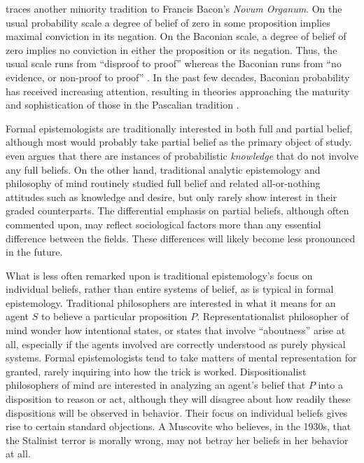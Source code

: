 \citet{cohen1980some} traces another minority tradition to Francis Bacon's {\em
Novum Organum}. On the usual probability scale a degree of belief of zero in
some proposition implies maximal conviction in its negation. On the Baconian
scale, a degree of belief of zero implies no conviction in either the
proposition or its negation. Thus, the usual scale runs from ``disproof to
proof'' whereas the Baconian runs from ``no evidence, or non-proof to proof''
\citep[p. 224]{cohen1980some}.  In the past few decades, Baconian probability
has received increasing attention, resulting in theories approaching the
maturity and sophistication of those in the Pascalian tradition
\citep{spohn2012laws, huber2019ranking}.

Formal epistemologists are traditionally interested in both full and partial
belief, although most would probably take partial belief as the primary object
of study. \citet{moss2018probabilistic} even argues that there are instances of
probabilistic {\em knowledge} that do not involve any full beliefs.  On the
other hand, traditional analytic epistemology and philosophy of mind routinely
studied full belief and related all-or-nothing attitudes such as knowledge and
desire, but only rarely show interest in their graded counterparts. The
differential emphasis on partial beliefs, although often commented upon, may
reflect sociological factors more than any essential difference between the
fields. These differences will likely become less pronounced in the future.

What is less often remarked upon is traditional epistemology's focus on
individual beliefs, rather than entire systems of belief, as is typical in
formal epistemology. Traditional philosophers are interested in what it means
for an agent $S$ to believe a particular proposition $P$. Representationalist
philosopher of mind wonder how intentional states, or states that involve
``aboutness'' arise at all, especially if the agents involved are correctly
understood as purely physical systems. Formal epistemologists tend to take
matters of mental representation for granted, rarely inquiring into how the
trick is worked.  Dispositionalist philosophers of mind are interested in
analyzing an agent's belief that $P$ into a disposition to reason or act,
although they will disagree about how readily these dispositions will be
observed in behavior. Their focus on individual beliefs gives rise to certain
standard objections. A Muscovite who believes, in the 1930s, that the Stalinist
terror is morally wrong, may not betray her beliefs in her behavior at all.

